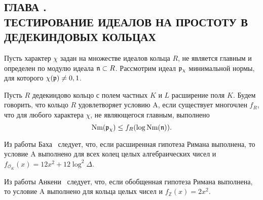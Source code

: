 \documentclass[_00_dissertation.tex]{subfiles}
\begin{document}
\onlyinsubfile{
    \renewcommand{\contentsname}{ОГЛАВЛЕНИЕ}
    \setcounter{tocdepth}{3}
    \tableofcontents
}

\newpage
\begin{center}
    \section*{ГЛАВА .\\ ТЕСТИРОВАНИЕ ИДЕАЛОВ НА ПРОСТОТУ В ДЕДЕКИНДОВЫХ КОЛЬЦАХ}\label{section:Primality}
\end{center}

\begin{definition}
    Пусть характер $\chi$ задан на множестве идеалов кольца $R$, не является главным и определен по модулю идеала $\mathfrak{n} \subset R$.
    Рассмотрим идеал $\mathfrak{p}_{\chi}$ минимальной нормы, для которого $\chi(\mathfrak{p}) \neq 0, 1$.

    Пусть $R$ дедекиндово кольцо с полем частных $K$ и $L$ расширение поля $K$.
    Будем говорить, что кольцо $R$ удовлетворяет условию A, если существует многочлен $f_R$, что для любого характера $\chi$, не являющегося главным, выполнено
    \begin{equation*}
        \textrm{Nm}(\mathfrak{p}_{\chi}) \le f_R(\log{\textrm{Nm}(\mathfrak{n})}).
    \end{equation*}
\end{definition}

\begin{remark}
    Из работы Баха~\cite{source:Bach} следует, что, если расширенная гипотеза Римана выполнена, то условие A выполнено для всех колец целых алгебраических чисел и $f_{\mathcal{O}_K}(x) = 12x^2 + 12\log^2 \Delta$.
\end{remark}

\begin{remark}
    Из работы Анкени~\cite{source:Ankeny} следует, что, если обобщенная гипотеза Римана выполнена, то условие A выполнено для кольца целых чисел и $f_{\mathbb{Z}}(x) = 2x^2$.
\end{remark}
\end{document}
